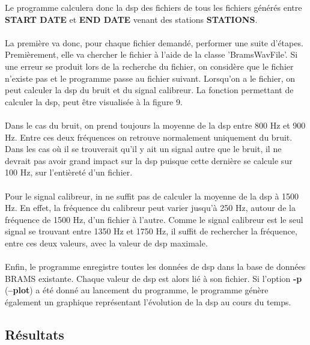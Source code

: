 \documentclass[11pt]{article}
\begin{document}
Le programme calculera donc la dsp des fichiers de tous les fichiers générés entre \textbf{START DATE} et \textbf{END DATE} venant des stations \textbf{STATIONS}.\\
\\
La première va donc, pour chaque fichier demandé, performer une suite d'étapes.
Premièrement, elle va chercher le fichier à l'aide de la classe 'BramsWavFile'.
Si une erreur se produit lors de la recherche du fichier, on considère que le fichier n'existe pas et le programme passe au fichier suivant.
Lorsqu'on a le fichier, on peut calculer la dsp du bruit et du signal calibreur.
La fonction permettant de calculer la dsp, peut être visualisée à la figure 9.\\
\\
Dans le cas du bruit, on prend toujours la moyenne de la dsp entre 800 Hz et 900 Hz.
Entre ces deux fréquences on retrouve normalement uniquement du bruit.
Dans les cas où il se trouverait qu'il y ait un signal autre que le bruit, il ne devrait pas avoir grand impact sur la dsp puisque cette dernière se calcule sur 100 Hz, sur l'entièreté d'un fichier.\\
\\
Pour le signal calibreur, in ne suffit pas de calculer la moyenne de la dsp à 1500 Hz.
En effet, la fréquence du calibreur peut varier jusqu'à 250 Hz, autour de la fréquence de 1500 Hz, d'un fichier à l'autre.
Comme le signal calibreur est le seul signal se trouvant entre 1350 Hz et 1750 Hz, il suffit de rechercher la fréquence, entre ces deux valeurs, avec la valeur de dsp maximale.\\
\\
Enfin, le programme enregistre toutes les données de dsp dans la base de données BRAMS existante.
Chaque valeur de dsp est alors lié à son fichier.
Si l'option \textbf{-p} (\textbf{--plot}) a été donné au lancement du programme, le programme génère également un graphique représentant l'évolution de la dsp au cours du temps.

\subsection{Résultats}
\end{document}
